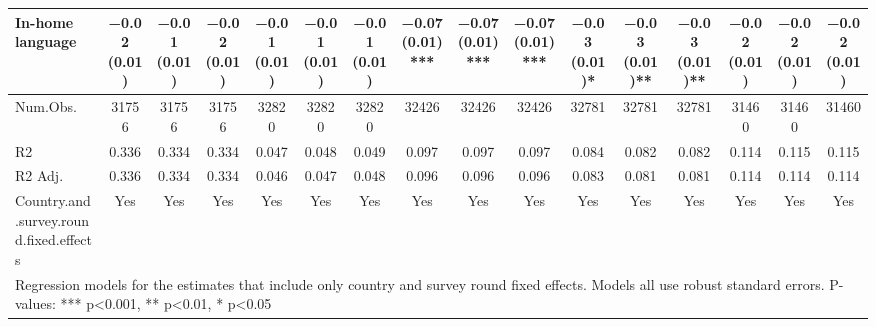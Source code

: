 \begin{table}
\begin{tabular}[t]{lccccccccccccccc}
In-home language & \num{-0.02} (\num{0.01}) & \num{-0.01} (\num{0.01}) & \num{-0.02} (\num{0.01}) & \num{-0.01} (\num{0.01}) & \num{-0.01} (\num{0.01}) & \num{-0.01} (\num{0.01}) & \num{-0.07} (\num{0.01})*** & \num{-0.07} (\num{0.01})*** & \num{-0.07} (\num{0.01})*** & \num{-0.03} (\num{0.01})* & \num{-0.03} (\num{0.01})** & \num{-0.03} (\num{0.01})** & \num{-0.02} (\num{0.01}) & \num{-0.02} (\num{0.01}) & \num{-0.02} (\num{0.01})\\
\midrule
Num.Obs. & \num{31756} & \num{31756} & \num{31756} & \num{32820} & \num{32820} & \num{32820} & \num{32426} & \num{32426} & \num{32426} & \num{32781} & \num{32781} & \num{32781} & \num{31460} & \num{31460} & \num{31460}\\
R2 & \num{0.336} & \num{0.334} & \num{0.334} & \num{0.047} & \num{0.048} & \num{0.049} & \num{0.097} & \num{0.097} & \num{0.097} & \num{0.084} & \num{0.082} & \num{0.082} & \num{0.114} & \num{0.115} & \num{0.115}\\
R2 Adj. & \num{0.336} & \num{0.334} & \num{0.334} & \num{0.046} & \num{0.047} & \num{0.048} & \num{0.096} & \num{0.096} & \num{0.096} & \num{0.083} & \num{0.081} & \num{0.081} & \num{0.114} & \num{0.114} & \num{0.114}\\
Country.and.survey.round.fixed.effects & Yes & Yes & Yes & Yes & Yes & Yes & Yes & Yes & Yes & Yes & Yes & Yes & Yes & Yes & Yes\\
\bottomrule
\multicolumn{16}{l}{\rule{0pt}{1em}Regression models for the estimates that include only country and survey round fixed effects. Models all use robust standard errors. P-values: *** p<0.001, ** p<0.01, * p<0.05}\\
\end{tabular}
\end{table}
